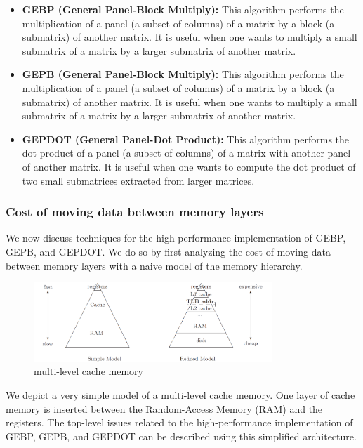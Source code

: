 \begin{itemize}
\item \textbf{GEBP (General Panel-Block Multiply):} This algorithm performs the multiplication of a panel (a subset of columns) of a matrix by a block (a submatrix) of another matrix. It is useful when one wants to multiply a small submatrix of a matrix by a larger submatrix of another matrix.

\item \textbf{GEPB (General Panel-Block Multiply):} This algorithm performs the multiplication of a panel (a subset of columns) of a matrix by a block (a submatrix) of another matrix. It is useful when one wants to multiply a small submatrix of a matrix by a larger submatrix of another matrix.

\item \textbf{GEPDOT (General Panel-Dot Product):} This algorithm performs the dot product of a panel (a subset of columns) of a matrix with another panel of another matrix. It is useful when one wants to compute the dot product of two small submatrices extracted from larger matrices.
\end{itemize}

\subsubsection*{Cost of moving data between memory layers}
We now discuss techniques for the high-performance implementation of GEBP, GEPB, and GEPDOT. We do so by first analyzing the cost of moving data between memory layers with a naive model of the memory hierarchy. 

\begin{figure}[H]
\centering
\includegraphics[width=90mm]{Figures/Imagenes/Memory_anatomy.png}
\caption{multi-level cache memory}
\end{figure}

We depict a very simple model of a multi-level cache memory. One layer of cache memory is inserted between the Random-Access Memory (RAM) and the registers. The top-level issues related to the high-performance implementation of GEBP, GEPB, and GEPDOT can be described using this simplified architecture.

